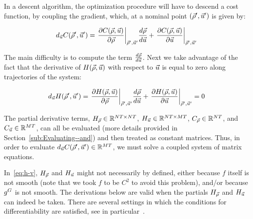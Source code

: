 In a descent algorithm, the optimization procedure will have to descend
a cost function, by coupling the gradient, which, at a nominal point
$\left(\nominal{\state},\nominal{\control}\right)$ is given by:

\begin{equation}
d_{\control}\cost\left(\nominal{\state},\nominal{\control}\right)=\evaluate{\pfrac{\cost\text{\ensuremath{\left(\state,\control\right)}}}{\state}}{\nominal{\state},\nominal{\control}}\Dfrac{\state}{\control}+\evaluate{\pfrac{\cost\text{\ensuremath{\left(\state,\control\right)}}}{\control}}{\nominal{\state},\nominal{\control}}\label{eq:j-v}
\end{equation}


The main difficulty is to compute the term $\frac{d\vec{\rho}}{d\vec{u}}$.
Next we take advantage of the fact that the derivative of $H\left(\state,\control\right)$
with respect to $\vec{u}$ is equal to zero along trajectories of
the system:

\begin{equation}
d_{\control}\sys\left(\nominal{\state},\nominal{\control}\right)=\evaluate{\pfrac{\sys\text{\ensuremath{\left(\state,\control\right)}}}{\state}}{\nominal{\state},\nominal{\control}}\Dfrac{\state}{\control}+\evaluate{\pfrac{\sys\text{\ensuremath{\left(\state,\control\right)}}}{\control}}{\nominal{\state},\nominal{\control}}=0\label{eq:h-v}
\end{equation}


The partial derivative terms, $H_{\vec{\rho}}\in\mathbb{R}^{NT\times NT}$,
$H_{\vec{u}}\in\mathbb{R}^{NT\times MT}$, $C_{\vec{\rho}}\in\mathbb{R}^{NT}$,
and $C_{\vec{u}}\in\mathbb{R}^{MT}$, can all be evaluated (more
details provided in Section~\ref{sub:Evaluating--and}) and then
treated as constant matrices. Thus, in order to evaluate $d_{\control}\cost\left(\nominal{\state},\nominal{\control}\right)\in\mathbb{R}^{\ncontrols\ntime}$,
we must solve a coupled system of matrix equations.
\begin{note}
In~\eqref{eq:h-v}, $H_{\vec{\rho}}$ and $H_{\vec{u}}$ might not necessarily by defined,
either because $f$ itself is not smooth (note that we took $f$ to
be $C^{2}$ to avoid this problem), and/or because $g^{G}$ is not
smooth. The derivations below are valid when the partials $H_{\vec{\rho}}$ and
$H_{\vec{u}}$ can indeed be taken. There are several settings in which the
conditions for differentiability are satisfied, see in particular~\cite{Gugat2005,Flasskamp2012}.
\end{note}

